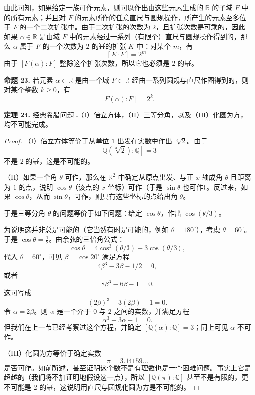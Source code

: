 由此可知，如果给定一族可作元素，则可以作出由这些元素生成的 $\mathbb R$ 的子域 $F$ 中的所有元素；并且对 $F$ 的元素所作的任意直尺与圆规操作，所产生的元素至多位于 $F$ 的一个二次扩张中。由于二次扩张的次数为 $2$，且扩张次数是可乘的，因此如果 $\alpha\in\mathbb R$ 是由域 $F$ 中的元素经过一系列（有限个）直尺与圆规操作得到的，那么 $\alpha$ 属于 $F$ 的一个次数为 $2$ 的幂的扩张 $K$ 中：对某个 $m$，有
\[
[K:F]=2^m.
\]
由于 $[F(\alpha):F]$ 整除这个扩张次数，所以它也必须是 $2$ 的幂。

\noindent\textbf{命题 23.} 若元素 $\alpha\in\mathbb R$ 是由一个域 $F\subset\mathbb R$ 经由一系列圆规与直尺作图得到的，则对某个整数 $k\geq 0$，有
\[
[F(\alpha):F]=2^k.
\]

\noindent\textbf{定理 24.} 经典希腊问题：（I）倍立方体，（II）三等分角，以及（III）化圆为方，均不可能完成。

\begin{proof}
	（I）倍立方体等价于从单位 $1$ 出发在实数中作出 $\sqrt[3]{2}$。由于
	\[
	[\mathbb Q(\sqrt[3]{2}):\mathbb Q]=3
	\]
	不是 $2$ 的幂，这是不可能的。
	
	（II）如果一个角 $\theta$ 可作，那么在 $\mathbb R^2$ 中确定从原点出发、与正 $x$ 轴成角 $\theta$ 且距离为 $1$ 的点，说明 $\cos\theta$（该点的 $x$-坐标）可作（于是 $\sin\theta$ 也可作）。反过来，如果 $\cos\theta$，从而 $\sin\theta$，可作，则具有这些坐标的点给出角 $\theta$。
	
	于是三等分角 $\theta$ 的问题等价于如下问题：给定 $\cos\theta$，作出 $\cos(\theta/3)$。
	
	为说明这并非总是可能的（它当然有时是可能的，例如 $\theta=180^\circ$），考虑 $\theta=60^\circ$。于是 $\cos\theta=\frac12$。由余弦的三倍角公式：
	\[
	\cos\theta=4\cos^3(\theta/3)-3\cos(\theta/3),
	\]
	代入 $\theta=60^\circ$，可见 $\beta=\cos20^\circ$ 满足方程
	\[
	4\beta^3-3\beta-1/2=0,
	\]
	或者
	\[
	8\beta^3-6\beta-1=0.
	\]
	这可写成
	\[
	(2\beta)^3-3(2\beta)-1=0.
	\]
	令 $\alpha=2\beta$。则 $\alpha$ 是一个介于 $0$ 与 $2$ 之间的实数，并满足方程
	\[
	\alpha^3-3\alpha-1=0.
	\]
	但我们在上一节已经考察过这个方程，并确定 $[\mathbb Q(\alpha):\mathbb Q]=3$；同上可见 $\alpha$ 不可作。
	
	（III）化圆为方等价于确定实数
	\[
	\pi=3.14159\ldots
	\]
	是否可作。如前所述，甚至证明这个数不是有理数也是一个困难问题。事实上它是超越的（我们将不加证明地假设这一点），所以 $[\mathbb Q(\pi):\mathbb Q]$ 甚至不是有限的，更不可能是 $2$ 的幂，这说明用直尺与圆规化圆为方是不可能的。
\end{proof}

